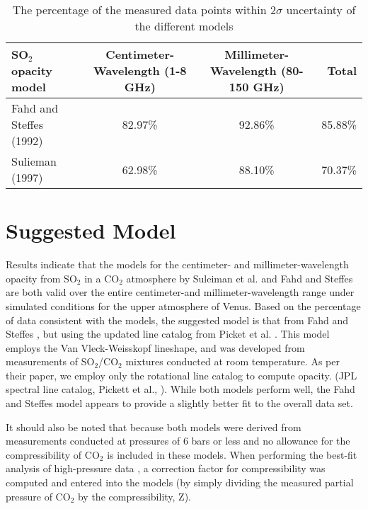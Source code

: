 \begin{sidewaystable}[p]

\caption{The percentage of the measured data points within $2\sigma$ uncertainty of the different models}
  \begin{tabular}{l | c c | r}
  \hline
  \hline
  SO$_2$ opacity model & Centimeter-Wavelength (1-8 GHz) & Millimeter-Wavelength (80-150 GHz) &Total\\
  \hline
  Fahd and Steffes (1992)	 & 82.97\%	& 	92.86\%& 85.88\%\\
  Sulieman (1997)& 62.98\%	&	88.10\%&70.37\%\\
  \hline
  \hline
  \end{tabular}
  \label{tab:model-comp}
\end{sidewaystable}

 


\clearpage

\section{Suggested Model}
Results indicate that the models for the centimeter- and millimeter-wavelength opacity from SO$_2$ in a CO$_2$ atmosphere by Suleiman et al. \cite{Suleiman-1996} and Fahd and Steffes \cite{Fahd-1991} are both valid over the entire centimeter-and millimeter-wavelength range under simulated conditions for the upper atmosphere of Venus. Based on the percentage of data consistent with the models, the suggested model is that from Fahd and Steffes \cite{Fahd-thesis}, but using the updated line catalog from Picket et al. \cite{Pickett-1998}. This model employs the Van Vleck-Weisskopf lineshape, and was developed from measurements of SO$_2$/CO$_2$ mixtures conducted at room temperature. As per their paper, we employ only the rotational line catalog to compute opacity. (JPL spectral line catalog, Pickett et al., \cite{Pickett-1998}). While both models perform well, the Fahd and Steffes \cite{Fahd-1991}  model appears to provide a slightly better fit to the overall data set. 

It should also be noted that because both models were derived from measurements conducted at pressures of 6 bars or less and no allowance for the compressibility of CO$_2$ is included in these models. When performing the best-fit analysis of high-pressure data \cite{Steffes-2014}, a correction factor for compressibility was computed and entered into the models (by simply dividing the measured partial pressure of CO$_2$ by the compressibility, Z). 

